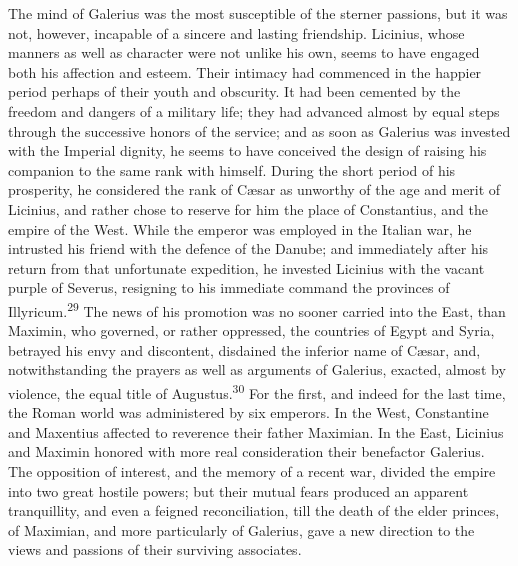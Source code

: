 The mind of Galerius was the most susceptible of the sterner
passions, but it was not, however, incapable of a sincere and
lasting friendship. Licinius, whose manners as well as character
were not unlike his own, seems to have engaged both his affection
and esteem. Their intimacy had commenced in the happier period
perhaps of their youth and obscurity. It had been cemented by the
freedom and dangers of a military life; they had advanced almost
by equal steps through the successive honors of the service; and
as soon as Galerius was invested with the Imperial dignity, he
seems to have conceived the design of raising his companion to
the same rank with himself. During the short period of his
prosperity, he considered the rank of Cæsar as unworthy of the
age and merit of Licinius, and rather chose to reserve for him
the place of Constantius, and the empire of the West. While the
emperor was employed in the Italian war, he intrusted his friend
with the defence of the Danube; and immediately after his return
from that unfortunate expedition, he invested Licinius with the
vacant purple of Severus, resigning to his immediate command the
provinces of Illyricum.\textsuperscript{29} The news of his promotion was no
sooner carried into the East, than Maximin, who governed, or
rather oppressed, the countries of Egypt and Syria, betrayed his
envy and discontent, disdained the inferior name of Cæsar, and,
notwithstanding the prayers as well as arguments of Galerius,
exacted, almost by violence, the equal title of Augustus.\textsuperscript{30} For
the first, and indeed for the last time, the Roman world was
administered by six emperors. In the West, Constantine and
Maxentius affected to reverence their father Maximian. In the
East, Licinius and Maximin honored with more real consideration
their benefactor Galerius. The opposition of interest, and the
memory of a recent war, divided the empire into two great hostile
powers; but their mutual fears produced an apparent tranquillity,
and even a feigned reconciliation, till the death of the elder
princes, of Maximian, and more particularly of Galerius, gave a
new direction to the views and passions of their surviving
associates.



